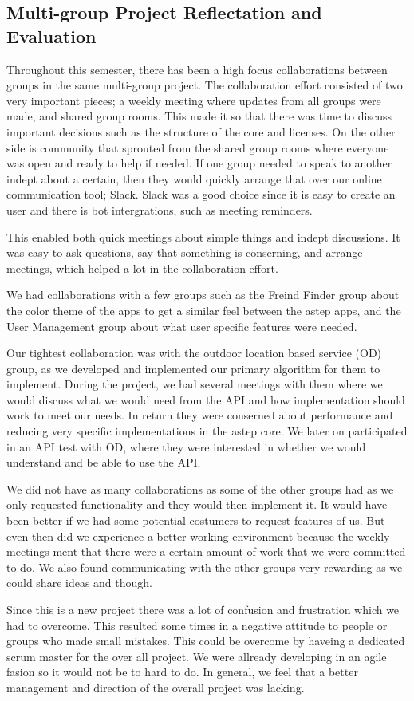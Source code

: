 \subsection{Multi-group Project Reflectation and Evaluation}
Throughout this semester, there has been a high focus collaborations between groups in the same multi-group project.
The collaboration effort consisted of two very important pieces; a weekly meeting where updates from all groups were made, and shared group rooms.
This made it so that there was time to discuss important decisions such as the structure of the core and licenses.
On the other side is community that sprouted from the shared group rooms where everyone was open and ready to help if needed.
If one group needed to speak to another indept about a certain, then they would quickly arrange that over our online communication tool; Slack.
Slack was a good choice since it is easy to create an user and there is bot intergrations, such as meeting reminders.

This enabled both quick meetings about simple things and indept discussions.
It was easy to ask questions, say that something is conserning, and arrange meetings, which helped a lot in the collaboration effort.

We had collaborations with a few groups such as the Freind Finder group about the color theme of the apps to get a similar feel between the \gls{astep} apps, and the User Management group about what user specific features were needed.

Our tightest collaboration was with the outdoor location based service (OD) group, as we developed and implemented our primary algorithm for them to implement.
During the project, we had several meetings with them where we would discuss what we would need from the API and how implementation should work to meet our needs.
In return they were conserned about performance and reducing very specific implementations in the \gls{astep} core.
We later on participated in an API test with OD, where they were interested in whether we would understand and be able to use the API.

We did not have as many collaborations as some of the other groups had as we only requested functionality and they would then implement it.
It would have been better if we had some potential costumers to request features of us.
But even then did we experience a better working environment because the weekly meetings ment that there were a certain amount of work that we were committed to do.
We also found communicating with the other groups very rewarding as we could share ideas and though.

Since this is a new project there was a lot of confusion and frustration which we had to overcome.
This resulted some times in a negative attitude to people or groups who made small mistakes.
This could be overcome by haveing a dedicated scrum master for the over all project.
We were allready developing in an agile fasion so it would not be to hard to do.
In general, we feel that a better management and direction of the overall project was lacking.
